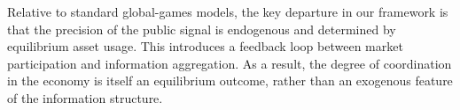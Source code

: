 Relative to standard global-games models, the key departure in our framework is that the precision of the public signal is endogenous and determined by equilibrium asset usage. This introduces a feedback loop between market participation and information aggregation. As a result, the degree of coordination in the economy is itself an equilibrium outcome, rather than an exogenous feature of the information structure.